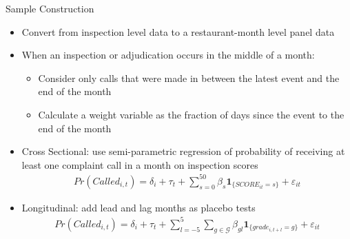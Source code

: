 \documentclass[handout]{beamer}
\begin{document}
\begin{frame}{Sample Construction}
\begin{itemize}
\item Convert from inspection level data to a restaurant-month level panel data
\item When an inspection or adjudication occurs in the middle of a month: 
\begin{itemize}
\item Consider only calls that were made in between the latest event and the end of the month
\item Calculate a weight variable as the fraction of days since the event to the end of the month
\end{itemize}
\end{itemize}
\end{frame}

\begin{frame}
\begin{itemize}
\item Cross Sectional: use semi-parametric regression of probability of receiving at least one complaint call in a month on inspection scores
\begin{align*}
    Pr(Called_{i,t}) = \delta_i + \tau_t + \sum_{s = 0} ^{50} \beta_s \textbf{1}_{\{SCORE_{it} = s\}} + \varepsilon_{it}
\end{align*}
\item Longitudinal: add lead and lag months as placebo tests
\begin{align*}
Pr(Called_{i,t}) = \delta_i + \tau_t +\sum_{l = -5}^5 \sum_{g \in \mathcal{G} } \beta_{gl} \textbf{1}_{\{grade_{i,t+l} = g\}} + \varepsilon_{it}
\end{align*}
\end{itemize}
\end{frame}
\end{document}
